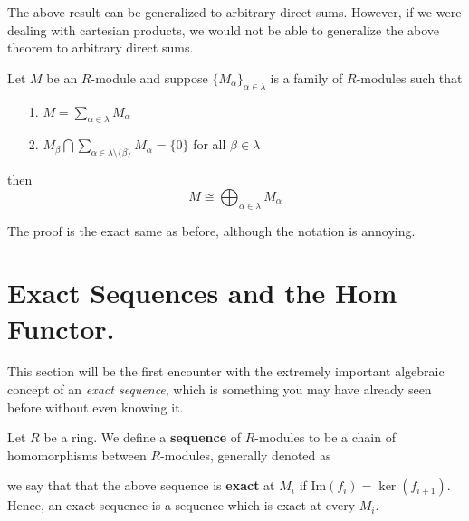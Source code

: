 \documentclass[12pt,letterpaper]{algebra_book}
\newcommand{\im}{\mbox{Im}}
\theoremstyle{definition}
\begin{document}
The above result can be generalized to arbitrary direct sums. However, if we
were dealing with cartesian products, we would not be able to
generalize the above theorem to arbitrary direct sums. 

\begin{thm}
    Let $M$ be an $R$-module and suppose $\{M_\alpha\}_{\alpha \in
    \lambda}$ is a family of $R$-modules such that 
    \begin{itemize}
        \item[1.] $\displaystyle M = \sum_{\alpha \in \lambda}
        M_\alpha$ 
        \item[2.] $M_\beta \bigcap \displaystyle  \sum_{\alpha \in
        \lambda\setminus\{\beta\}}M_\alpha = \{0\}$ for all $\beta
        \in \lambda$
    \end{itemize}
    then 
    \[
        M \cong \bigoplus_{\alpha \in \lambda}M_{\alpha}
    \]
    \vspace{-0.7cm}
\end{thm}

The proof is the exact same as before, although the notation is
annoying. 


\newpage
\section{Exact Sequences and the Hom Functor.}

This section will be the first encounter with the extremely
important algebraic concept of an \textit{exact sequence}, which
is something you may have already seen before without even knowing
it. 

\begin{definition}
    Let $R$ be a ring. We define a \textbf{sequence} of
    $R$-modules to be a chain of homomorphisms between
    $R$-modules, generally denoted as
    \begin{center}
    \end{center}
    we say that that the above sequence is \textbf{exact} at $M_i$
    if $\im(f_i) = \ker(f_{i+1})$. Hence, an exact sequence is a
    sequence which is exact at every $M_i$. 
\end{definition}
\end{document}

